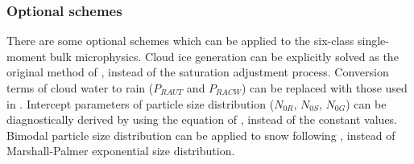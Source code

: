 \subsubsection{Optional schemes}
There are some optional schemes which can be applied to the six-class single-moment bulk microphysics. Cloud ice generation can be explicitly solved as the original method of \citet{lin_etal_1983}, instead of the saturation adjustment process. Conversion terms of cloud water to rain ($P_{RAUT}$ and $P_{RACW}$) can be replaced with those used in \citet{khairoutdinov_and_kogan_2000}. Intercept parameters of particle size distribution ($N_{0R}$, $N_{0S}$, $N_{0G}$) can be diagnostically derived by using the equation of \citet{wainwright_etal_2014}, instead of the constant values. Bimodal particle size distribution can be applied to snow following \citet{roh_and_satoh_2007}, instead of Marshall-Palmer exponential size distribution.
